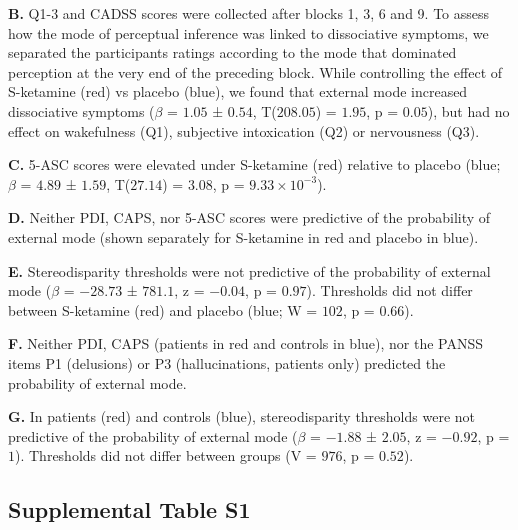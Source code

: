 \documentclass[
]{article}
\begin{document}
\textbf{B.} Q1-3 and CADSS scores were collected after blocks 1, 3, 6
and 9. To assess how the mode of perceptual inference was linked to
dissociative symptoms, we separated the participants ratings according
to the mode that dominated perception at the very end of the preceding
block. While controlling the effect of S-ketamine (red) vs placebo
(blue), we found that external mode increased dissociative symptoms
(\(\beta\) = \(1.05\) ± \(0.54\), T(\(208.05\)) = \(1.95\), p =
\(0.05\)), but had no effect on wakefulness (Q1), subjective
intoxication (Q2) or nervousness (Q3).

\textbf{C.} 5-ASC scores were elevated under S-ketamine (red) relative
to placebo (blue; \(\beta\) = \(4.89\) ± \(1.59\), T(\(27.14\)) =
\(3.08\), p = \(\ensuremath{9.33\times 10^{-3}}\)).

\textbf{D.} Neither PDI, CAPS, nor 5-ASC scores were predictive of the
probability of external mode (shown separately for S-ketamine in red and
placebo in blue).

\textbf{E.} Stereodisparity thresholds were not predictive of the
probability of external mode (\(\beta\) = \(-28.73\) ± \(781.1\), z =
\(-0.04\), p = \(0.97\)). Thresholds did not differ between S-ketamine
(red) and placebo (blue; W = \(102\), p = \(0.66\)).

\textbf{F.} Neither PDI, CAPS (patients in red and controls in blue),
nor the PANSS items P1 (delusions) or P3 (hallucinations, patients only)
predicted the probability of external mode.

\textbf{G.} In patients (red) and controls (blue), stereodisparity
thresholds were not predictive of the probability of external mode
(\(\beta\) = \(-1.88\) ± \(2.05\), z = \(-0.92\), p = \(1\)). Thresholds
did not differ between groups (V = \(976\), p = \(0.52\)).

\newpage

\subsection{Supplemental Table S1}\label{supplemental-table-s1}
\end{document}
